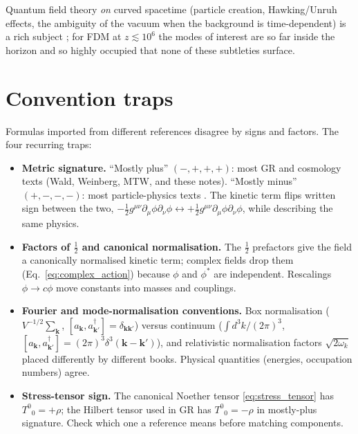 \documentclass[12pt]{article}
\newcommand{\bk}{\mathbf{k}}
\begin{document}
Quantum field theory \emph{on} curved spacetime (particle creation,
Hawking/Unruh effects, the ambiguity of the vacuum when the
background is time-dependent) is a rich subject
\citep{BirrellDavies1982}; for FDM at $z \lesssim 10^6$ the modes of
interest are so far inside the horizon and so highly occupied that
none of these subtleties surface.

\section{Convention traps}
\label{sec:conventions}

Formulas imported from different references disagree by signs and
factors.  The four recurring traps:
%
\begin{itemize}
  \item \textbf{Metric signature.}  ``Mostly plus'' $(-,+,+,+)$:
        most GR and cosmology texts (Wald, Weinberg, MTW, and these
        notes).  ``Mostly minus'' $(+,-,-,-)$: most particle-physics
        texts \citep{PeskinSchroeder1995}.  The kinetic term flips
        written sign between the two,
        $-\tfrac{1}{2}g^{\mu\nu}\partial_\mu\phi\partial_\nu\phi
        \leftrightarrow
        +\tfrac{1}{2}g^{\mu\nu}\partial_\mu\phi\partial_\nu\phi$,
        while describing the same physics.
  \item \textbf{Factors of $\tfrac{1}{2}$ and canonical
        normalisation.}  The $\tfrac{1}{2}$ prefactors give the
        field a canonically normalised kinetic term; complex fields
        drop them (Eq.~\eqref{eq:complex_action}) because
        $\phi$ and $\phi^*$ are independent.  Rescalings
        $\phi \to c\phi$ move constants into masses and couplings.
  \item \textbf{Fourier and mode-normalisation conventions.}
        Box normalisation ($V^{-1/2}\sum_\bk$,
        $[a_\bk,a^\dagger_{\bk'}]=\delta_{\bk\bk'}$) versus
        continuum ($\int d^3k/(2\pi)^3$,
        $[a_\bk,a^\dagger_{\bk'}]=(2\pi)^3\delta^3(\bk-\bk')$),
        and relativistic normalisation factors $\sqrt{2\omega_k}$
        placed differently by different books.  Physical quantities
        (energies, occupation numbers) agree.
  \item \textbf{Stress-tensor sign.}  The canonical Noether tensor
        \eqref{eq:stress_tensor} has $T^0{}_0 = +\rho$; the Hilbert
        tensor used in GR has $T^0{}_0 = -\rho$ in mostly-plus
        signature.  Check which one a reference means before
        matching components.
\end{itemize}
\end{document}
